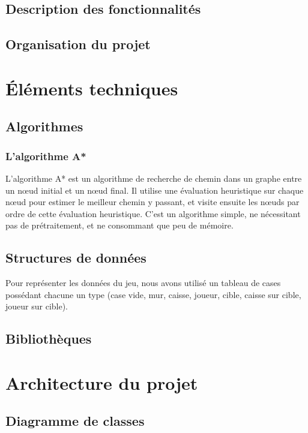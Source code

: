 \documentclass[a4paper, 11pt]{report}
\begin{document}
\section{Description des fonctionnalités}

\section{Organisation du projet}


\chapter{Éléments techniques}

\section{Algorithmes}

\subsection{L'algorithme A*}

L'algorithme A* \cite{wiki:Astar} est un algorithme de recherche de chemin dans un graphe entre un n\oe ud initial et un n\oe ud final. Il utilise une évaluation heuristique sur chaque n\oe ud pour estimer le meilleur chemin y passant, et visite ensuite les n\oe uds par ordre de cette évaluation heuristique. C'est un algorithme simple, ne nécessitant pas de prétraitement, et ne consommant que peu de mémoire.

\section{Structures de données}

Pour représenter les données du jeu, nous avons utilisé un tableau de cases possédant chacune un type (case vide, mur, caisse, joueur, cible, caisse sur cible, joueur sur cible).

\section{Bibliothèques}


\chapter{Architecture du projet}

\section{Diagramme de classes}
\end{document}

